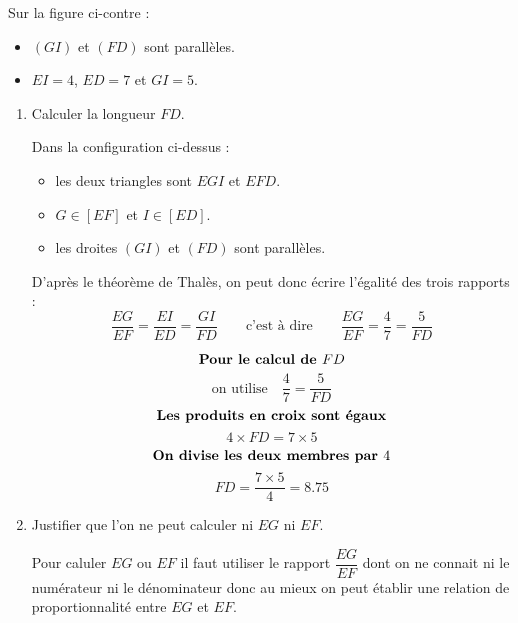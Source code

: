     \phantom{rrr}

    \begin{minipage}{0.6\linewidth}
        Sur la figure ci-contre :
        \begin{itemize}
            \item $(GI)$ et $(FD)$ sont parallèles.
            \item $EI=4$, $ED=7$ et $GI=5$.
        \end{itemize}
    \end{minipage}
    \begin{minipage}{0.3\linewidth}
    \end{minipage}
        \begin{enumerate}
            \item Calculer la longueur $FD$.

            {\color{red}
            Dans la configuration ci-dessus :
            \begin{itemize}
                \item les deux triangles sont $EGI$ et $EFD$.
                \item $G \in [EF]$ et $I \in [ED]$.
                \item les droites $(GI)$ et $(FD)$ sont parallèles.
            \end{itemize}
            D'après le théorème de Thalès, on peut donc écrire l'égalité des trois rapports :
            $$\frac{EG}{EF}=\frac{EI}{ED}=\frac{GI}{FD}\qquad\mbox{c'est à dire}\qquad\frac{EG}{EF}=\frac{4}{7}=\frac{5}{FD}$$

                $$\mbox{\bf Pour le calcul de $FD$}$$
                $$\mbox{on utilise} \quad \dfrac{4}{7}=\dfrac{5}{FD}$$
                $$\mbox{\bf Les produits en croix sont égaux}$$
                $$4\times FD=7\times5$$
                $$\mbox{\bf On divise les deux membres par $4$}$$
                $$FD=\frac{7\times5}{4}=\num{8.75}$$
            }
            \item Justifier que l'on ne peut calculer ni $EG$ ni $EF$.

            {\color{red} Pour caluler $EG$ ou $EF$ il faut utiliser le rapport $\dfrac{EG}{EF}$ dont on ne connait ni le
            numérateur ni le dénominateur donc au mieux on peut établir une relation de proportionnalité entre $EG$ et $EF$.}
        \end{enumerate}


